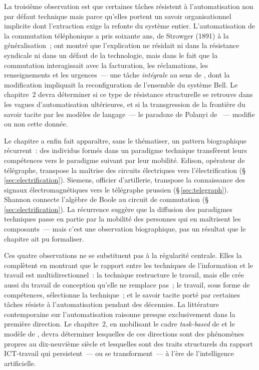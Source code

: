 La troisième observation est que certaines tâches résistent à l'automatisation non par défaut technique mais parce qu'elles portent un savoir organisationnel implicite dont l'extraction exige la refonte du système entier. L'automatisation de la commutation téléphonique a pris soixante ans, de Strowger (1891) à la généralisation~; \textcite{feigenbaum_organizational_2024} ont montré que l'explication ne résidait ni dans la résistance syndicale ni dans un défaut de la technologie, mais dans le fait que la commutation interagissait avec la facturation, les réclamations, les renseignements et les urgences~--- une tâche \emph{intégrale} au sens de \textcite{ulrich_role_1995}, dont la modification impliquait la reconfiguration de l'ensemble du système Bell. Le chapitre~2 devra déterminer si ce type de résistance structurelle se retrouve dans les vagues d'automatisation ultérieures, et si la transgression de la frontière du savoir tacite par les modèles de langage~--- le \og paradoxe de Polanyi\fg{} de \textcite{autor_polanyi_2014}~--- modifie ou non cette donnée.

Le chapitre a enfin fait apparaître, sans le thématiser, un pattern biographique récurrent~: des individus formés dans un paradigme technique transfèrent leurs compétences vers le paradigme suivant par leur mobilité. Edison, opérateur de télégraphe, transpose la maîtrise des circuits électriques vers l'électrification (§\,\ref{sec:electrification}). Siemens, officier d'artillerie, transpose la connaissance des signaux électromagnétiques vers le télégraphe prussien (§\,\ref{sec:telegraph}). Shannon connecte l'algèbre de Boole au circuit de commutation (§\,\ref{sec:electrification}). La récurrence suggère que la diffusion des paradigmes techniques passe en partie par la mobilité des personnes qui en maîtrisent les composants~--- mais c'est une observation biographique, pas un résultat que le chapitre ait pu formaliser.

Ces quatre observations ne se substituent pas à la régularité centrale. Elles la complètent en montrant que le rapport entre les techniques de l'information et le travail est multidirectionnel~: la technique restructure le travail, mais elle crée aussi du travail de conception qu'elle ne remplace pas~; le travail, sous forme de compétences, sélectionne la technique~; et le savoir tacite porté par certaines tâches résiste à l'automatisation pendant des décennies. La littérature contemporaine sur l'automatisation raisonne presque exclusivement dans la première direction. Le chapitre~2, en mobilisant le cadre \emph{task-based} de \textcite{autor_skills_2003} et le modèle de \textcite{acemoglu_race_2018}, devra déterminer lesquelles de ces directions sont des phénomènes propres au dix-neuvième siècle et lesquelles sont des traits structurels du rapport ICT-travail qui persistent~--- ou se transforment~--- à l'ère de l'intelligence artificielle.


